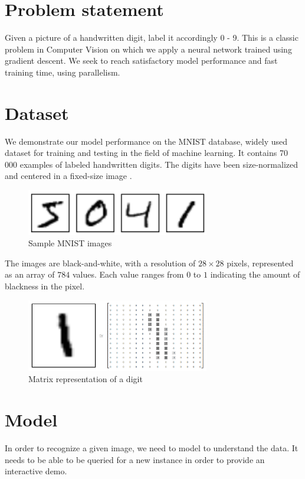 \documentclass[a4paper]{article}
\begin{document}
 
\section{Problem statement}
\label{sec:problem}
Given a picture of a handwritten digit, label it accordingly 0 - 9.
This is a classic problem in Computer Vision on which we apply a neural network trained using gradient descent. We seek to reach satisfactory model performance and fast training time, using parallelism.


\section{Dataset}
\label{sec:dataset}
We demonstrate our model performance on the MNIST database, widely used dataset for training and testing in the field of machine learning. It contains 70 000 examples of labeled handwritten digits. The digits have been size-normalized and centered in a fixed-size image \cite{mnist}. 

\begin{figure}[htb]
\centering
\includegraphics[width=8cm]{images/mnist-images.png}
\caption{Sample MNIST images \cite{tf}}
\end{figure}


The images are black-and-white, with a resolution of $28 \times 28$ pixels, represented as an array of $784$ values. Each value ranges from $0$ to $1$ indicating the amount of blackness in the pixel.

\begin{figure}[htb]
\centering
\includegraphics[width=8cm]{images/mnist-matrix.png}
\caption{Matrix representation of a digit \cite{tf}}
\end{figure}


\newpage
\section{Model}
\label{sec:model}
In order to recognize a given image, we need to model to understand the data. It needs to be able to be queried for a new instance in order to provide an interactive demo.
\\
\end{document}
